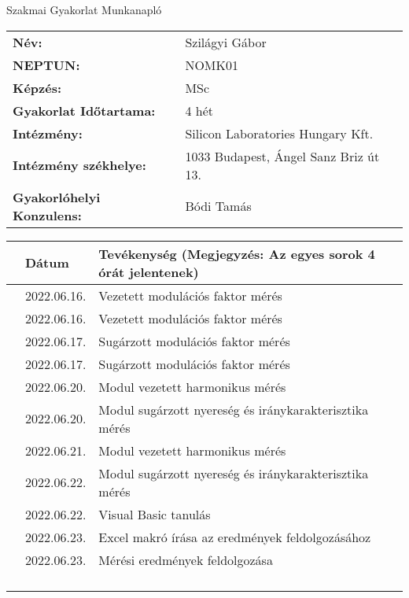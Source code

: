 \documentclass[10pt,a4paper,oneside]{report}
\newcounter{magicrownumbers}
\newcommand\rownum{\stepcounter{magicrownumbers}\arabic{magicrownumbers}}
\begin{document}
\begin{center}
	\Large{Szakmai Gyakorlat Munkanapló}
\end{center}
\begin{tabular}{p{} p{}}
	\textbf{Név:} & Szilágyi Gábor \\
	\textbf{NEPTUN:} & NOMK01 \\
	\textbf{Képzés:} & MSc \\
	\textbf{Gyakorlat Időtartama:} & 4 hét\\
	\textbf{Intézmény:} & Silicon Laboratories Hungary Kft.\\
	\textbf{Intézmény székhelye:} & 1033 Budapest, Ángel Sanz Briz út 13. \\
	\textbf{Gyakorlóhelyi Konzulens:} & Bódi Tamás
\end{tabular}
\begin{table}[h!]
	\centering
	\small
	\begin{tabular}{| c | p{3 cm} | p{10 cm} |}
	\hline
	 & Dátum & Tevékenység (Megjegyzés: Az egyes sorok 4 órát jelentenek) \\ \hline \hline
	\rownum & 2022.06.16. & Vezetett modulációs faktor mérés \\ \hline
	\rownum & 2022.06.16. & Vezetett modulációs faktor mérés \\ \hline
	\rownum & 2022.06.17. & Sugárzott modulációs faktor mérés \\ \hline
	\rownum & 2022.06.17. & Sugárzott modulációs faktor mérés \\ \hline
	\rownum & 2022.06.20. & Modul vezetett harmonikus mérés \\ \hline
	\rownum & 2022.06.20. & Modul sugárzott nyereség és iránykarakterisztika mérés  \\ \hline
	\rownum & 2022.06.21. & Modul vezetett harmonikus mérés \\ \hline
	\rownum & 2022.06.22. & Modul sugárzott nyereség és iránykarakterisztika mérés \\ \hline
	\rownum & 2022.06.22. & Visual Basic tanulás \\ \hline
	\rownum & 2022.06.23. & Excel makró írása az eredmények feldolgozásához \\ \hline
	\rownum & 2022.06.23. & Mérési eredmények feldolgozása \\ \hline
	\rownum &  &  \\ \hline
	\rownum &  &  \\ \hline
	\rownum &  &  \\ \hline
	\rownum &  &  \\ \hline

\end{tabular}
\end{table}
\end{document}
